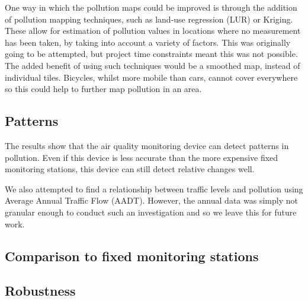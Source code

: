 \documentclass[11pt,twosided,a4paper]{report}
\begin{document}
One way in which the pollution maps could be improved is through the addition of pollution mapping techniques, such as land-use regression (LUR) or Kriging. These allow for estimation of pollution values in locations where no measurement has been taken, by taking into account a variety of factors. This was originally going to be attempted, but project time constraints meant this was not possible. The added benefit of using such techniques would be a smoothed map, instead of individual tiles. Bicycles, whilst more mobile than cars, cannot cover everywhere so this could help to further map pollution in an area.



\subsection{Patterns}

The results show that the air quality monitoring device can detect patterns in pollution. Even if this device is less accurate than the more expensive fixed monitoring stations, this device can still detect relative changes well.

We also attempted to find a relationship between traffic levels and pollution using Average Annual Traffic Flow (AADT). However, the annual data was simply not granular enough to conduct such an investigation and so we leave this for future work.

\subsection{Comparison to fixed monitoring stations}



\subsection{Robustness}
\end{document}
